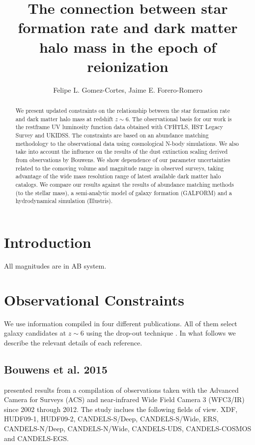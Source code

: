 \documentclass{emulateapj}
\begin{document}
\title{The connection between star formation rate and dark matter halo
  mass in the epoch of reionization}  


\author{Felipe L. Gomez-Cortes, Jaime E. Forero-Romero}  

\begin{abstract}
We present updated constraints on the relationship between the star
formation rate and dark matter halo mass at redshift $z\sim 6$.
The observational basis for our work is the restframe UV luminosity
function data obtained with CFHTLS, HST Legacy Survey and UKIDSS.
The constraints are based on an abundance matching methodology to the
observational data using cosmological N-body simulations.
We also take into account the influence on the results of the dust extinction
scaling derived from observations by Bouwens.
We show dependence of our parameter uncertainties related to the
comoving volume and magnitude range in observed surveys, taking advantage of the 
wide mass resolution range of latest available dark matter halo catalogs.
We compare our results against the results of abundance matching
methods (to the stellar mass), a semi-analytic model of galaxy
formation (GALFORM) and a hydrodynamical simulation (Illustris).
\end{abstract}


\section{Introduction}
\label{sec:intro}


All magnitudes are in AB system.
\section{Observational Constraints}
\label{sec:theo}

We use information compiled in four different publications. 
All of them select galaxy candidates at $z\sim 6$ using the drop-out
technique \citep{Steidel96}.  
In what follows we describe the relevant details of each reference.


\subsection{Bouwens et al. 2015}
\citet{Bouwens15} presented results from a compilation of
observations taken with the Advanced Camera for Surveys (ACS) and
near-infrared Wide Field Camera 3 (WFC3/IR) since 2002 through 2012. 
The study inclues the following fields of view. XDF,
HUDF09-1, HUDF09-2, CANDELS-S/Deep,  CANDELS-S/Wide, ERS,
CANDELS-N/Deep, CANDELS-N/Wide, CANDELS-UDS,  CANDELS-COSMOS and
CANDELS-EGS.
\end{document}
